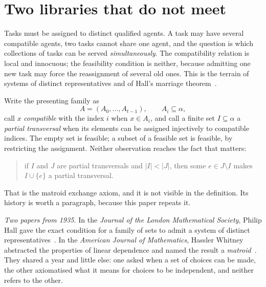 \documentclass[11pt]{article}
\begin{document}
\section{Two libraries that do not meet}\label{sec:intro}

Tasks must be assigned to distinct qualified agents. A task may have several compatible agents,
two tasks cannot share one agent, and the question is which collections of tasks can be served
\emph{simultaneously}. The compatibility relation is local and innocuous; the feasibility
condition is neither, because admitting one new task may force the reassignment of several old
ones. This is the terrain of systems of distinct representatives and of Hall's marriage
theorem~\cite{hall}.

Write the presenting family as
\[
  A=(A_0,\dots,A_{t-1}),\qquad A_i\subseteq\alpha,
\]
call $x$ \emph{compatible} with the index $i$ when $x\in A_i$, and call a finite set
$I\subseteq\alpha$ a \emph{partial transversal} when its elements can be assigned injectively to
compatible indices. The empty set is feasible; a subset of a feasible set is feasible, by
restricting the assignment. Neither observation reaches the fact that matters:

\begin{quote}
if $I$ and $J$ are partial transversals and $|I|<|J|$, then some $e\in J\setminus I$ makes
$I\cup\{e\}$ a partial transversal.
\end{quote}

That is the matroid exchange axiom, and it is not visible in the definition. Its history is worth
a paragraph, because this paper repeats it.

\emph{Two papers from 1935.} In the \emph{Journal of the London Mathematical Society}, Philip Hall
gave the exact condition for a family of sets to admit a system of distinct
representatives~\cite{hall}. In the \emph{American Journal of Mathematics}, Hassler Whitney
abstracted the properties of linear dependence and named the result a \emph{matroid}~\cite{whitney}.
They shared a year and little else: one asked when a set of choices can be made, the other
axiomatised what it means for choices to be independent, and neither refers to the other.
\end{document}

